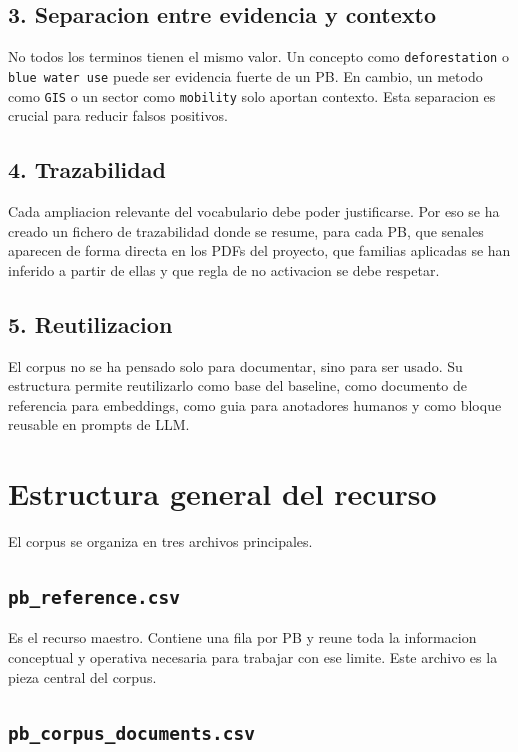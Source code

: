 \documentclass[11pt,a4paper]{article}
\begin{document}
\subsection{3. Separacion entre evidencia y contexto}

No todos los terminos tienen el mismo valor. Un concepto como \texttt{deforestation} o \texttt{blue water use} puede ser evidencia fuerte de un PB. En cambio, un metodo como \texttt{GIS} o un sector como \texttt{mobility} solo aportan contexto. Esta separacion es crucial para reducir falsos positivos.

\subsection{4. Trazabilidad}

Cada ampliacion relevante del vocabulario debe poder justificarse. Por eso se ha creado un fichero de trazabilidad donde se resume, para cada PB, que senales aparecen de forma directa en los PDFs del proyecto, que familias aplicadas se han inferido a partir de ellas y que regla de no activacion se debe respetar.

\subsection{5. Reutilizacion}

El corpus no se ha pensado solo para documentar, sino para ser usado. Su estructura permite reutilizarlo como base del baseline, como documento de referencia para embeddings, como guia para anotadores humanos y como bloque reusable en prompts de LLM.

\section{Estructura general del recurso}

El corpus se organiza en tres archivos principales.

\subsection{\texttt{pb\_reference.csv}}

Es el recurso maestro. Contiene una fila por PB y reune toda la informacion conceptual y operativa necesaria para trabajar con ese limite. Este archivo es la pieza central del corpus.

\subsection{\texttt{pb\_corpus\_documents.csv}}
\end{document}
